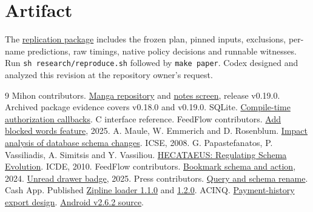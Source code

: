 \documentclass[11pt,a4paper]{article}
\newcommand{\code}[1]{\texttt{#1}}
\begin{document}
\section*{Artifact}
The \href{https://github.com/oraoraoraaa/least-privilege-lab/tree/research/classroom-replay/research/triage}{replication package} includes the frozen plan, pinned inputs, exclusions, per-name predictions, raw timings, native policy decisions and runnable witnesses. Run \code{sh research/reproduce.sh} followed by \code{make paper}. Codex designed and analyzed this revision at the repository owner's request.
\begin{thebibliography}{9}\small\setlength{\itemsep}{2pt}
 Mihon contributors. \href{https://github.com/mihonapp/mihon/blob/e4de208cf75e273b425bf4b1fe4bd7bc3d9cc459/data/src/main/java/tachiyomi/data/manga/MangaRepositoryImpl.kt}{Manga repository} and \href{https://github.com/mihonapp/mihon/blob/e4de208cf75e273b425bf4b1fe4bd7bc3d9cc459/app/src/main/java/eu/kanade/tachiyomi/ui/manga/notes/MangaNotesScreen.kt}{notes screen}, release v0.19.0. Archived package evidence covers v0.18.0 and v0.19.0.
 SQLite. \href{https://sqlite.org/c3ref/set_authorizer.html}{Compile-time authorization callbacks}. C interface reference.
 FeedFlow contributors. \href{https://github.com/prof18/feed-flow/commit/0a45953705fbeaaaedeba92fd0fa33473a66d33e}{Add blocked words feature}, 2025.
 A. Maule, W. Emmerich and D. Rosenblum. \href{https://doi.org/10.1145/1368088.1368150}{Impact analysis of database schema changes}. ICSE, 2008.
 G. Papastefanatos, P. Vassiliadis, A. Simitsis and Y. Vassiliou. \href{https://www.cse.uoi.gr/~pvassil/publications/2010_ICDE/ICDE_2010.pdf}{HECATAEUS: Regulating Schema Evolution}. ICDE, 2010.
 FeedFlow contributors. \href{https://github.com/prof18/feed-flow/commit/4916711df767bef323740134d66b1ce141258edd}{Bookmark schema and action}, 2024. \href{https://github.com/prof18/feed-flow/commit/379e6ad8338023226c7a5113e78d9325d3702e0d}{Unread drawer badge}, 2025.
 Press contributors. \href{https://github.com/saket/press/commit/c242592fb7}{Query and schema rename}.
 Cash App. Published \href{https://repo.maven.apache.org/maven2/app/cash/zipline/zipline-loader-jvm/1.1.0/}{Zipline loader 1.1.0} and \href{https://repo.maven.apache.org/maven2/app/cash/zipline/zipline-loader-jvm/1.2.0/}{1.2.0}.
 ACINQ. \href{https://github.com/ACINQ/phoenix/pull/337}{Payment-history export design}. \href{https://github.com/ACINQ/phoenix/tree/3d6da2b5b17c297fe8b177304df6f4adff86763e}{Android v2.6.2 source}.
\end{thebibliography}
\end{document}
